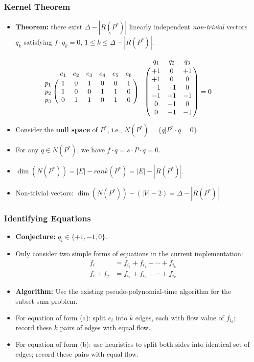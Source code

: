 \frame
{
	\frametitle{Kernel Theorem}
	\begin{itemize}
	\item {\bf Theorem:} there exist $\Delta - |R(P^*)|$ linearly independent
	{\it non-trivial} vectors $q_k$ satisfying $f\cdot q_k = 0$, $1\le k\le \Delta - |R(P^*)|$.
	\end{itemize}

	\vspace{0.6cm}

	

	\vspace{-0.5cm}

	\begin{displaymath}
	\bordermatrix{
		~   & e_1 & e_2 & e_3 & e_4 & e_5 & e_6\cr
		p_1 & 1 & 0 & 1 & 0 & 0 & 1 \cr
		p_2 & 1 & 0 & 0 & 1 & 1 & 0 \cr
		p_3 & 0 & 1 & 1 & 0 & 1 & 0 \cr
	} 
	\bordermatrix{
   	   ~& q_1 & q_2 & q_3 \cr
		& +1 &  0 & +1  \cr
		& +1 &  0 &  0  \cr
		& -1 & +1 &  0  \cr
		& -1 & +1 & -1  \cr
		&  0 & -1 &  0  \cr
		&  0 & -1 & -1  \cr
	} = 0
	\end{displaymath}

	\begin{itemize}
	\item Consider the {\bf null space} of $P^*$, i.e., $N(P^*) = \{q | P^*\cdot q = 0\}$.
	\item For any $q\in N(P^*)$, we have $f\cdot q = s\cdot P \cdot q = 0$. 
	\item $\dim(N(P^*)) = |E| - rank(P^*) = |E| - |R(P^*)|$. 
	\item Non-trivial vectors: $\dim(N(P^*)) - (|V| - 2) = \Delta - |R(P^*)|$. 
	\end{itemize}
}

\frame
{
	\frametitle{Identifying Equations}
	\begin{itemize}
	\item {\bf Conjecture:} $q_i \in \{+1, -1, 0\}$.
	\vspace{0.2cm}
	\item Only consider two simple forms of equations in the current implementation:
		\begin{align}
		f_i & =  f_{i_1} + f_{i_2} + \cdots + f_{i_k} \tag{a}\\
		f_i + f_j & = f_{i_1} + f_{i_2} + \cdots + f_{i_k} \tag{b}
		\end{align}
	\item {\bf Algorithm:} Use the existing pseudo-polynomial-time algorithm for the subset-sum problem.
	\vspace{0.2cm}
	\item For equation of form (a): split $e_i$ into $k$ edges, each with flow
	value of $f_{i_k}$; record these $k$ pairs of edges with equal flow.
	\vspace{0.2cm}
	\item For equation of form (b): use heuristics to split both sides into
			identical set of edges; record these pairs with equal flow.
	\end{itemize}
}

